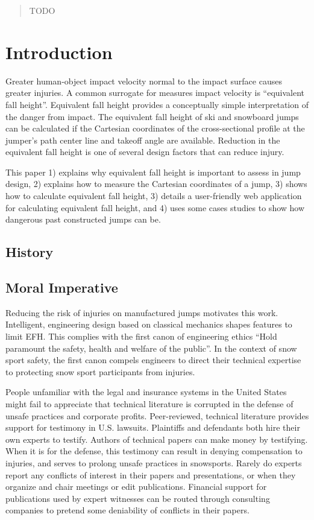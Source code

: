 \documentclass{article}
\begin{document}
\begin{abstract}
    TODO
\end{abstract}

\section{Introduction}
%
Greater human-object impact velocity normal to the impact surface causes
greater injuries.
A common surrogate for measures impact velocity is ``equivalent fall height''.
Equivalent fall height provides a conceptually simple interpretation of the
danger from impact.
The equivalent fall height of ski and snowboard jumps can be calculated if the
Cartesian coordinates of the cross-sectional profile at the jumper's path
center line and takeoff angle are available.
Reduction in the equivalent fall height is one of several design factors that
can reduce injury.

This paper 1) explains why equivalent fall height is important to assess in
jump design, 2) explains how to measure the Cartesian coordinates of a jump, 3)
shows how to calculate equivalent fall height, 3) details a user-friendly web
application for calculating equivalent fall height, and 4) uses some cases
studies to show how dangerous past constructed jumps can be.

\subsection{History}
%

\subsection{Moral Imperative}
%
Reducing the risk of injuries on manufactured jumps motivates this work.
Intelligent, engineering design based on classical mechanics shapes features to
limit EFH. This complies with the first canon of engineering ethics ``Hold
paramount the safety, health and welfare of the public''. In the context of
snow sport safety, the first canon compels engineers to direct their technical
expertise to protecting snow sport participants from injuries.

People unfamiliar with the legal and insurance systems in the United States
might fail to appreciate that technical literature is corrupted in the defense
of unsafe practices and corporate profits. Peer-reviewed, technical literature
provides support for testimony in U.S. lawsuits. Plaintiffs and defendants both
hire their own experts to testify. Authors of technical papers can make money
by testifying. When it is for the defense, this testimony can result in denying
compensation to injuries, and serves to prolong unsafe practices in snowsports.
Rarely do experts report any conflicts of interest in their papers and
presentations, or when they organize and chair meetings or edit publications.
Financial support for publications used by expert witnesses can be routed
through consulting companies to pretend some deniability of conflicts in their
papers.
\end{document}
